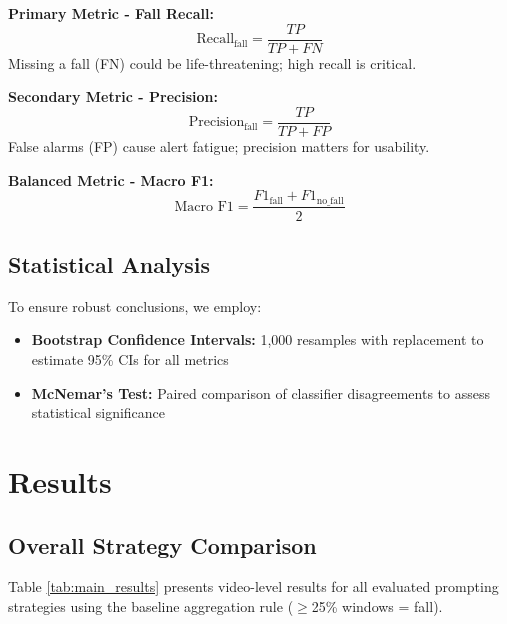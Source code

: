 \documentclass[conference]{IEEEtran}
\begin{document}
\textbf{Primary Metric - Fall Recall:}
\begin{equation}
\text{Recall}_{\text{fall}} = \frac{TP}{TP + FN}
\end{equation}
Missing a fall (FN) could be life-threatening; high recall is critical.

\textbf{Secondary Metric - Precision:}
\begin{equation}
\text{Precision}_{\text{fall}} = \frac{TP}{TP + FP}
\end{equation}
False alarms (FP) cause alert fatigue; precision matters for usability.

\textbf{Balanced Metric - Macro F1:}
\begin{equation}
\text{Macro F1} = \frac{F1_{\text{fall}} + F1_{\text{no\_fall}}}{2}
\end{equation}

\subsection{Statistical Analysis}

To ensure robust conclusions, we employ:
\begin{itemize}[leftmargin=*]
    \item \textbf{Bootstrap Confidence Intervals:} 1,000 resamples with replacement to estimate 95\% CIs for all metrics
    \item \textbf{McNemar's Test:} Paired comparison of classifier disagreements to assess statistical significance
\end{itemize}

\section{Results}

\subsection{Overall Strategy Comparison}

Table \ref{tab:main_results} presents video-level results for all evaluated prompting strategies using the baseline aggregation rule ($\geq$25\% windows = fall).
\end{document}
